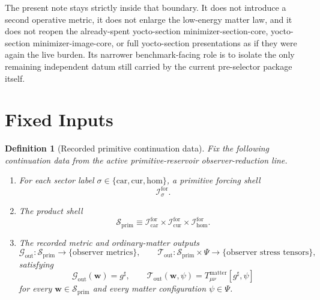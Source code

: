 \documentclass[11pt]{article}
\newcommand{\CompletedMetric}{g^{\sharp}}
\newcommand{\MatterSpace}{\Psi}
\newcommand{\Car}{\mathrm{car}}
\newcommand{\Cur}{\mathrm{cur}}
\newcommand{\Hom}{\mathrm{hom}}
\newcommand{\ForSpace}[1]{\mathcal I_{#1}^{\mathrm{for}}}
\newcommand{\PrimShell}{\mathcal S_{\mathrm{prim}}}
\newcommand{\MetricOut}{\mathscr G_{\mathrm{out}}}
\newcommand{\MatterOut}{\mathscr T_{\mathrm{out}}}
\newtheorem{definition}{Definition}
\begin{document}
The present note stays strictly inside that boundary. It does not introduce a second operative metric, it does not enlarge the low-energy matter law, and it does not reopen the already-spent yocto-section minimizer-section-core, yocto-section minimizer-image-core, or full yocto-section presentations as if they were again the live burden. Its narrower benchmark-facing role is to isolate the only remaining independent datum still carried by the current pre-selector package itself.

\section{Fixed Inputs}

\begin{definition}[Recorded primitive continuation data]
\label{def:fixed}
Fix the following continuation data from the active primitive-reservoir observer-reduction line.
\begin{enumerate}
    \item For each sector label \(\sigma\in\{\Car,\Cur,\Hom\}\), a primitive forcing shell
    \[
    \ForSpace{\sigma}.
    \]
    \item The product shell
    \[
    \PrimShell
    \equiv
    \ForSpace{\Car}\times \ForSpace{\Cur}\times \ForSpace{\Hom}.
    \]
    \item The recorded metric and ordinary-matter outputs
    \[
    \MetricOut:\PrimShell\to\{\text{observer metrics}\},
    \qquad
    \MatterOut:\PrimShell\times\MatterSpace\to\{\text{observer stress tensors}\},
    \]
    satisfying
    \begin{equation}
    \MetricOut(\mathbf w)=\CompletedMetric,
    \qquad
    \MatterOut(\mathbf w,\psi)
    =
    T_{\mu\nu}^{\mathrm{matter}}[\CompletedMetric,\psi]
    \label{eq:fixedoutputs}
    \end{equation}
    for every \(\mathbf w\in\PrimShell\) and every matter configuration \(\psi\in\MatterSpace\).
\end{enumerate}
\end{definition}
\end{document}
